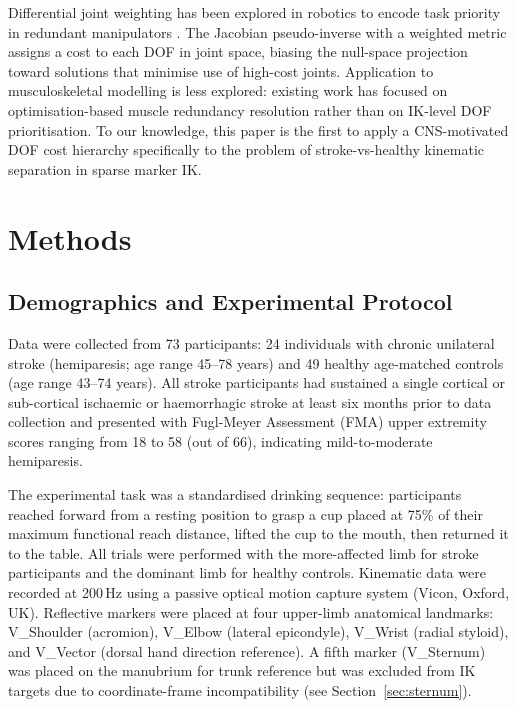 \documentclass[journal,10pt,twocolumn]{IEEEtran}
\begin{document}
Differential joint weighting has been explored in robotics to encode task
priority in redundant manipulators \cite{nakamura1987}. The Jacobian
pseudo-inverse with a weighted metric assigns a cost to each DOF in joint space,
biasing the null-space projection toward solutions that minimise use of
high-cost joints. Application to musculoskeletal modelling is less explored:
existing work has focused on optimisation-based muscle redundancy resolution
rather than on IK-level DOF prioritisation. To our knowledge, this paper is
the first to apply a CNS-motivated DOF cost hierarchy specifically to the
problem of stroke-vs-healthy kinematic separation in sparse marker IK.

\section{Methods}

\subsection{Demographics and Experimental Protocol}

Data were collected from 73 participants: 24 individuals with chronic
unilateral stroke (hemiparesis; age range 45--78 years) and 49 healthy
age-matched controls (age range 43--74 years). All stroke participants had
sustained a single cortical or sub-cortical ischaemic or haemorrhagic stroke
at least six months prior to data collection and presented with Fugl-Meyer
Assessment (FMA) upper extremity scores ranging from 18 to 58 (out of 66),
indicating mild-to-moderate hemiparesis.

The experimental task was a standardised drinking sequence: participants
reached forward from a resting position to grasp a cup placed at 75\% of
their maximum functional reach distance, lifted the cup to the mouth, then
returned it to the table. All trials were performed with the more-affected
limb for stroke participants and the dominant limb for healthy controls.
Kinematic data were recorded at 200\,Hz using a passive optical motion
capture system (Vicon, Oxford, UK). Reflective markers were placed at four
upper-limb anatomical landmarks: V\_Shoulder (acromion), V\_Elbow (lateral
epicondyle), V\_Wrist (radial styloid), and V\_Vector (dorsal hand direction
reference). A fifth marker (V\_Sternum) was placed on the manubrium for
trunk reference but was excluded from IK targets due to coordinate-frame
incompatibility (see Section~\ref{sec:sternum}).
\end{document}
